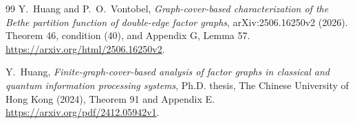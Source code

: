 \begin{thebibliography}{99}
Y.~Huang and P.~O.~Vontobel,
\emph{Graph-cover-based characterization of the Bethe partition function
of double-edge factor graphs}, arXiv:2506.16250v2 (2026).
Theorem 46, condition (40), and Appendix G, Lemma 57.
\url{https://arxiv.org/html/2506.16250v2}.

Y.~Huang, \emph{Finite-graph-cover-based analysis of factor graphs in
classical and quantum information processing systems}, Ph.D. thesis,
The Chinese University of Hong Kong (2024), Theorem 91 and Appendix E.
\url{https://arxiv.org/pdf/2412.05942v1}.

\end{thebibliography}
